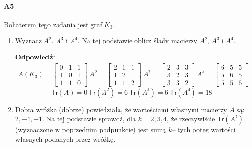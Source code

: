 \documentclass[a4paper,12pt]{article}
\theoremstyle{definition}%
\theoremstyle{definition}
\theoremstyle{problem}
\begin{document}
\paragraph{A5} Bohaterem tego zadania jest graf $K_3$.
\begin{enumerate}[label=\alph*)]
\item Wyznacz $A^2$, $A^3$ i $A^4$. Na tej podstawie oblicz ślady macierzy $A^2$, $A^3$ i $A^4$.

\textbf{Odpowiedź:}
\begin{align*}
A(K_3)=\begin{bmatrix}
0&1&1\\
1&0&1\\
1&1&0
\end{bmatrix}\ 
A^2=\begin{bmatrix}
2&1&1\\1&2&1\\1&1&2
\end{bmatrix}\ 
A^3=\begin{bmatrix}
2&3&3\\3&2&3\\3&3&2
\end{bmatrix}\ 
A^4=\begin{bmatrix}
6&5&5\\5&6&5\\5&5&6
\end{bmatrix}
\end{align*}
$$\mathsf{Tr}(A)=0\ \mathsf{Tr}(A^2)=6\ \mathsf{Tr}(A^3)=6\ \mathsf{Tr}(A^4)=18$$
\item Dobra wróżka (dobrze) powiedziała, że wartościami własnymi macierzy $A$ są: $2,-1,-1$. Na tej podstawie sprawdź, dla $k = 2, 3, 4$, że rzeczywiście $\mathsf{Tr}(A^k)$ (wyznaczone w poprzednim podpunkcie) jest sumą $k$– tych potęg wartości własnych podanych przez wróżkę.


\end{enumerate}
\end{document}
